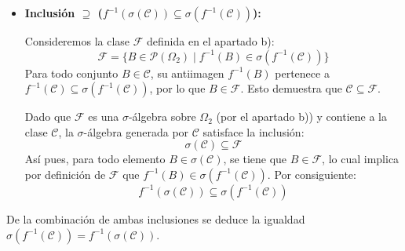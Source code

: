 \begin{problema}
\begin{enumerate}[label=\alph*)]
\begin{itemize}
        Puesto que $\sigma(f^{-1}(\mathcal{C}))$ es la menor $\sigma$-álgebra sobre $\Omega_1$ que contiene a la clase de generadores $f^{-1}(\mathcal{C})$, y $f^{-1}(\sigma(\mathcal{C}))$ es una $\sigma$-álgebra sobre $\Omega_1$ que la contiene, se concluye que:
        \[
            \sigma(f^{-1}(\mathcal{C})) \subseteq f^{-1}(\sigma(\mathcal{C}))
        \]

        \item \textbf{Inclusión $\supseteq$ ($f^{-1}(\sigma(\mathcal{C})) \subseteq \sigma(f^{-1}(\mathcal{C}))$):}
        
        Consideremos la clase $\mathcal{F}$ definida en el apartado b):
        \[
            \mathcal{F} = \{ B \in \mathcal{P}(\Omega_2) \mid f^{-1}(B) \in \sigma(f^{-1}(\mathcal{C})) \}
        \]
        Para todo conjunto $B \in \mathcal{C}$, su antiimagen $f^{-1}(B)$ pertenece a $f^{-1}(\mathcal{C}) \subseteq \sigma(f^{-1}(\mathcal{C}))$, por lo que $B \in \mathcal{F}$. Esto demuestra que $\mathcal{C} \subseteq \mathcal{F}$.
        
        Dado que $\mathcal{F}$ es una $\sigma$-álgebra sobre $\Omega_2$ (por el apartado b)) y contiene a la clase $\mathcal{C}$, la $\sigma$-álgebra generada por $\mathcal{C}$ satisface la inclusión:
        \[
            \sigma(\mathcal{C}) \subseteq \mathcal{F}
        \]
        Así pues, para todo elemento $B \in \sigma(\mathcal{C})$, se tiene que $B \in \mathcal{F}$, lo cual implica por definición de $\mathcal{F}$ que $f^{-1}(B) \in \sigma(f^{-1}(\mathcal{C}))$. Por consiguiente:
        \[
            f^{-1}(\sigma(\mathcal{C})) \subseteq \sigma(f^{-1}(\mathcal{C}))
        \]
    \end{itemize}

    De la combinación de ambas inclusiones se deduce la igualdad $\sigma(f^{-1}(\mathcal{C})) = f^{-1}(\sigma(\mathcal{C}))$.
\end{enumerate}
\end{problema}
